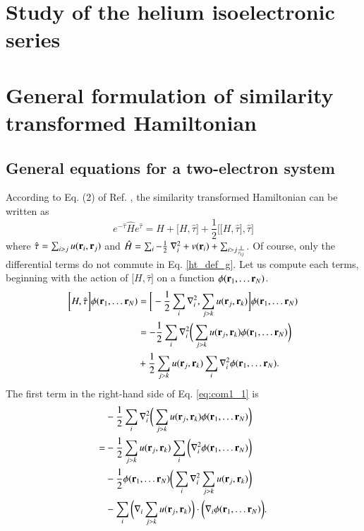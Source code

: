 \documentclass[aip,jcp,reprint,noshowkeys,superscriptaddress]{revtex4-1}
\newcommand{\br}[0]{{\bf {r}}}
\begin{document}
\section{Study of the helium isoelectronic series}

\section{General formulation of similarity transformed Hamiltonian}
\subsection{General equations for a two-electron system}
According to Eq. (2) of Ref. , the similarity transformed Hamiltonian can be written as 
\begin{equation}
 \label{ht_def_g}
 e^{-\hat{\tau}} \hat{H} e^{\hat{\tau}} = H + \big[ H,\hat{\tau} \big] + \frac{1}{2}\bigg[ \big[H,\hat{\tau}\big],\hat{\tau}\bigg]
\end{equation}
where $\hat{\tau} = \sum_{i>j}u(\br{}_i,\br{}_j)$ and $\hat{H} = \sum_i -\frac{1}{2} \nabla^2_i + v(\br{}_i) + \sum_{i>j \frac{1}{r_{ij}}}$. Of course, only the differential terms do not commute in Eq. \eqref{ht_def_g}. 
Let us compute each terms, beginning with the action of $\big[ H,\hat{\tau} \big]$ on a function $\phi(\br{}_1,\hdots \br{}_N)$.
\begin{equation}
 \label{eq:com1_1}
 \begin{aligned}
 \bigg[ H,\hat{\tau} \bigg]\phi(\br{}_1,\hdots \br{}_N) & = \bigg[ -\frac{1}{2} \sum_i \nabla^2_i, \sum_{j>k} u(\br{}_j,\br{}_k) \bigg] \phi(\br{}_1,\hdots \br{}_N) \\
  & = -\frac{1}{2} \sum_i \nabla^2_i\bigg( \sum_{j>k} u(\br{}_j,\br{}_k) \phi(\br{}_1,\hdots \br{}_N) \bigg) \\
  & +  \frac{1}{2} \sum_{j>k} u(\br{}_j,\br{}_k) \sum_i \nabla^2_i \phi(\br{}_1,\hdots \br{}_N). 
 \end{aligned}
\end{equation}
The first term in the right-hand side of Eq. \eqref{eq:com1_1} is 
\begin{equation}
 \label{eq:com1_2}
 \begin{aligned}
&  -\frac{1}{2} \sum_i \nabla^2_i\bigg( \sum_{j>k} u(\br{}_j,\br{}_k) \phi(\br{}_1,\hdots \br{}_N) \bigg) \\ 
= &-\frac{1}{2}\sum_{j>k} u(\br{}_j,\br{}_k) \sum_i \bigg( \nabla^2_i \phi(\br{}_1,\hdots \br{}_N)\bigg) \\
  &-\frac{1}{2}\phi(\br{}_1,\hdots \br{}_N) \bigg( \sum_i \nabla^2_i \sum_{j>k} u(\br{}_j,\br{}_k) \bigg) \\
  &-\sum_i \bigg(\nabla_i \sum_{j>k}u(\br{}_j,\br{}_k) \bigg) \cdot \bigg( \nabla_i \phi(\br{}_1,\hdots \br{}_N) \bigg).
 \end{aligned}
\end{equation}
\end{document}
